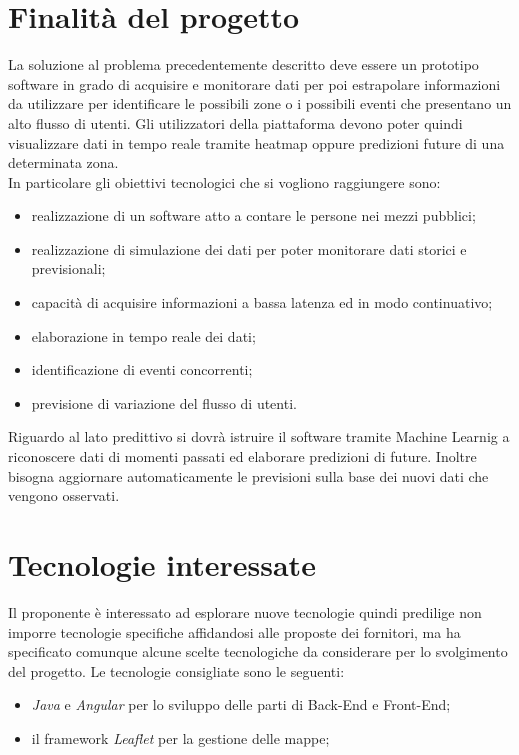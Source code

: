 \section{Finalità del progetto}
La soluzione al problema precedentemente descritto deve essere un prototipo software in grado di acquisire e monitorare dati per poi estrapolare informazioni da utilizzare per identificare le possibili zone o i possibili eventi che presentano un alto flusso di utenti. Gli utilizzatori della piattaforma devono poter quindi visualizzare dati in tempo reale tramite heatmap oppure predizioni future di una determinata zona. \\
In particolare gli obiettivi tecnologici che si vogliono raggiungere sono:
\begin{itemize}
	\item realizzazione di un software atto a contare le persone nei mezzi pubblici;
	\item realizzazione di simulazione dei dati per poter monitorare dati storici e previsionali;
	\item capacità di acquisire informazioni a bassa latenza ed in modo continuativo;
	\item elaborazione in tempo reale dei dati;
	\item identificazione di eventi concorrenti;
	\item previsione di variazione del flusso di utenti.
\end{itemize}
Riguardo al lato predittivo si dovrà istruire il software tramite Machine Learnig a riconoscere dati di momenti passati ed elaborare predizioni di future. Inoltre bisogna aggiornare automaticamente le previsioni sulla base dei nuovi dati che vengono osservati.
\section{Tecnologie interessate}
Il proponente è interessato ad esplorare nuove tecnologie quindi predilige non imporre tecnologie specifiche affidandosi alle proposte dei fornitori, ma ha specificato comunque alcune scelte tecnologiche da considerare per lo svolgimento del progetto. Le tecnologie consigliate sono le seguenti:
\begin{itemize}
	\item \textit{Java} e \textit{Angular} per lo sviluppo delle parti di Back-End e Front-End;
	\item il framework \textit{Leaflet} per la gestione delle mappe;
\end{itemize}
